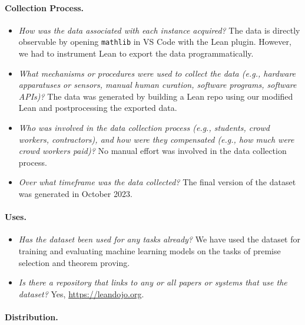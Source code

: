 \documentclass{article}
\newcommand{\weburl}{\url{https://leandojo.org}}
\newcommand{\smallsec}[1]{\vspace{-1mm} \paragraph{#1.}}
\begin{document}
\smallsec{Collection Process}

\begin{itemize}[leftmargin=*]

\item \emph{How was the data associated with each instance acquired?} The data is directly observable by opening \texttt{mathlib} in VS Code with the Lean plugin. However, we had to instrument Lean to export the data programmatically.

\item \emph{What mechanisms or procedures were used to collect the data (e.g., hardware apparatuses or sensors, manual human curation, software programs, software APIs)?} The data was generated by building a Lean repo using our modified Lean and postprocessing the exported data.

\item \emph{Who was involved in the data collection process (e.g., students, crowd workers, contractors), and how were they compensated (e.g., how much were crowd workers paid)?} No manual effort was involved in the data collection process.

\item \emph{Over what timeframe was the data collected?} The final version of the dataset was generated in October 2023. 

\end{itemize}

\smallsec{Uses}

\begin{itemize}[leftmargin=*]

\item \emph{Has the dataset been used for any tasks already?} We have used the dataset for training and evaluating machine learning models on the tasks of premise selection and theorem proving.

\item \emph{Is there a repository that links to any or all papers or systems that use the dataset?} Yes, {\weburl}.

\end{itemize}

\smallsec{Distribution}
\end{document}
